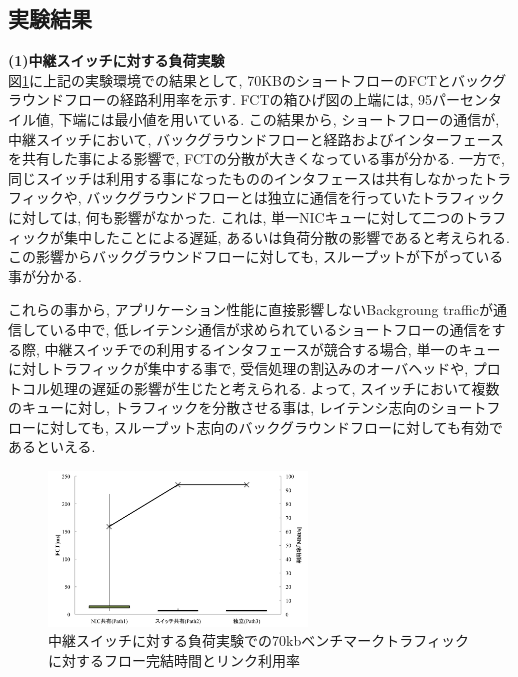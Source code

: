 \documentclass[11pt, a4paper, twocolumn]{jsarticle}
\begin{document}
\subsection{実験結果}
{\bf (1)中継スイッチに対する負荷実験}\\
図\ref{fig:improve}に上記の実験環境での結果として, 70KBのショートフローのFCTとバックグラウンドフローの経路利用率を示す.
FCTの箱ひげ図の上端には, 95パーセンタイル値, 下端には最小値を用いている.
この結果から, ショートフローの通信が, 中継スイッチにおいて, バックグラウンドフローと経路およびインターフェースを共有した事による影響で,
FCTの分散が大きくなっている事が分かる.
一方で, 同じスイッチは利用する事になったもののインタフェースは共有しなかったトラフィックや,
バックグラウンドフローとは独立に通信を行っていたトラフィックに対しては, 何も影響がなかった.
これは, 単一NICキューに対して二つのトラフィックが集中したことによる遅延,
あるいは負荷分散の影響であると考えられる.
この影響からバックグラウンドフローに対しても, スループットが下がっている事が分かる.

これらの事から, アプリケーション性能に直接影響しないBackgroung trafficが通信している中で,
低レイテンシ通信が求められているショートフローの通信をする際, 中継スイッチでの利用するインタフェースが競合する場合,
単一のキューに対しトラフィックが集中する事で, 受信処理の割込みのオーバヘッドや, プロトコル処理の遅延の影響が生じたと考えられる.
よって, スイッチにおいて複数のキューに対し, トラフィックを分散させる事は, レイテンシ志向のショートフローに対しても,
スループット志向のバックグラウンドフローに対しても有効であるといえる.
\begin{figure}[h]
    \begin{center}
    \includegraphics[autoebb, width=195pt]{./img/switch_verif.pdf}
    \caption{中継スイッチに対する負荷実験での70kbベンチマークトラフィックに対するフロー完結時間とリンク利用率}
    \label{fig:improve}
    \end{center}
\end{figure}
\end{document}
